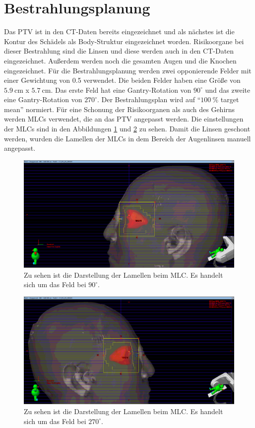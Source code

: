 \section{Bestrahlungsplanung}
\label{sec:Bestrahlungsplanung}
Das PTV ist in den CT-Daten bereits eingezeichnet und als nächstes ist die Kontur des Schädels als Body-Struktur eingezeichnet worden.
Risikoorgane bei dieser Bestrahlung sind die Linsen und diese werden auch in den CT-Daten eingezeichnet. Außerdem werden noch die gesamten Augen
und die Knochen eingezeichnet.
Für die Bestrahlungsplanung werden zwei opponierende Felder
mit einer Gewichtung von 0.5 verwendet. Die beiden Felder haben eine Größe von $\SI{5,9}{\centi\meter}$ x $\SI{5,7}{\centi\meter}$.
Das erste Feld hat eine Gantry-Rotation von $90^\circ$ und das zweite eine Gantry-Rotation von $270^\circ$.
Der Bestrahlungsplan wird auf \enquote{$\SI{100}{\percent}$ target mean} normiert. Für eine Schonung der Risikoorganen als auch des Gehirns werden
MLCs verwendet, die an das PTV angepasst werden. Die einstellungen der MLCs sind in den Abbildungen \ref{fig:mlcfeld1} und \ref{fig:mlcfeld2} zu sehen.
Damit die Linsen geschont werden, wurden die Lamellen der MLCs in dem Bereich der Augenlinsen manuell angepasst.

\begin{figure}[h]
	\centering
	\includegraphics[width=0.8\linewidth]{Bilder/MLC_Feld1}
	\caption{Zu sehen ist die Darstellung der Lamellen beim MLC. Es handelt sich um das Feld bei $90^\circ$.}
	\label{fig:mlcfeld1}
\end{figure}

\begin{figure}[h]
	\centering
	\includegraphics[width=0.8\linewidth]{Bilder/MLC_Feld2}
	\caption{Zu sehen ist die Darstellung der Lamellen beim MLC. Es handelt sich um das Feld bei $270^\circ$.}
	\label{fig:mlcfeld2}
\end{figure}
